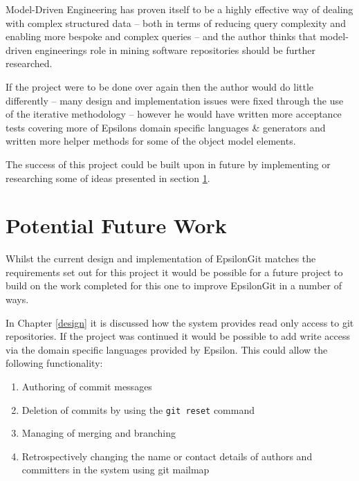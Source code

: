 \documentclass[11pt]{book}
\newcommand{\code}[1]{\texttt{#1}}
\begin{document}
Model-Driven Engineering has proven itself to be a highly effective way of dealing with complex structured data -- both in terms of reducing query complexity and enabling more bespoke and complex queries -- and the author thinks that model-driven engineerings role in mining software repositories should be further researched.

If the project were to be done over again then the author would do little differently -- many design and implementation issues were fixed through the use of the iterative methodology -- however he would have written more acceptance tests covering more of Epsilons domain specific languages \& generators and written more helper methods for some of the object model elements.

The success of this project could be built upon in future by implementing or researching some of ideas presented in section \ref{potentialfuturework}.

\section{Potential Future Work}
\label{potentialfuturework}
Whilst the current design and implementation of EpsilonGit matches the requirements set out for this project it would be possible for a future project to build on the work completed for this one to improve EpsilonGit in a number of ways. 

In Chapter \ref{design} it is discussed how the system provides read only access to git repositories. If the project was continued it would be possible to add write access via the domain specific languages provided by Epsilon. This could allow the following functionality:

\begin{enumerate}
	\item Authoring of commit messages
	\item Deletion of commits by using the \code{git reset} command \cite{gitreset}
	\item Managing of merging and branching
	\item Retrospectively changing the name or contact details of authors and committers in the system using git mailmap \cite{gitmailmap}
\end{enumerate} 
\end{document}
